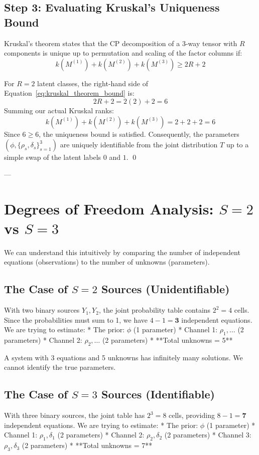 \documentclass[11pt,a4paper]{article}
\begin{document}
\subsection{Step 3: Evaluating Kruskal's Uniqueness Bound}
Kruskal's theorem states that the CP decomposition of a 3-way tensor with $R$ components is unique up to permutation and scaling of the factor columns if:
\begin{equation}\label{eq:kruskal_theorem_bound}
k(M^{(1)}) + k(M^{(2)}) + k(M^{(3)}) \ge 2R + 2
\end{equation}

For $R = 2$ latent classes, the right-hand side of Equation~\eqref{eq:kruskal_theorem_bound} is:
\[
2R + 2 = 2(2) + 2 = 6
\]
Summing our actual Kruskal ranks:
\[
k(M^{(1)}) + k(M^{(2)}) + k(M^{(3)}) = 2 + 2 + 2 = 6
\]
Since $6 \ge 6$, the uniqueness bound is satisfied. Consequently, the parameters $(\phi, \{\rho_s, \delta_s\}_{s=1}^3)$ are uniquely identifiable from the joint distribution $T$ up to a simple swap of the latent labels $0$ and $1$. \qed

---

\section{Degrees of Freedom Analysis: $S=2$ vs $S=3$}
We can understand this intuitively by comparing the number of independent equations (observations) to the number of unknowns (parameters).

\subsection{The Case of $S=2$ Sources (Unidentifiable)}
With two binary sources $Y_1, Y_2$, the joint probability table contains $2^2 = 4$ cells. Since the probabilities must sum to 1, we have $4 - 1 = \mathbf{3}$ independent equations.
We are trying to estimate:
* The prior: $\phi$ (1 parameter)
* Channel 1: $\rho_1, \dots$ (2 parameters)
* Channel 2: $\rho_2, \dots$ (2 parameters)
* **Total unknowns = 5**

A system with 3 equations and 5 unknowns has infinitely many solutions. We cannot identify the true parameters.

\subsection{The Case of $S=3$ Sources (Identifiable)}
With three binary sources, the joint table has $2^3 = 8$ cells, providing $8 - 1 = \mathbf{7}$ independent equations.
We are trying to estimate:
* The prior: $\phi$ (1 parameter)
* Channel 1: $\rho_1, \delta_1$ (2 parameters)
* Channel 2: $\rho_2, \delta_2$ (2 parameters)
* Channel 3: $\rho_3, \delta_3$ (2 parameters)
* **Total unknowns = 7**
\end{document}
